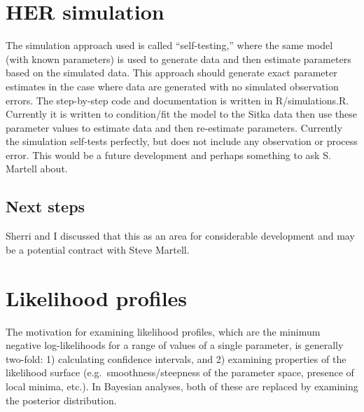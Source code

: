 \documentclass[]{article}
\begin{document}
\section{HER simulation}\label{her-simulation}

The simulation approach used is called ``self-testing,'' where the same
model (with known parameters) is used to generate data and then estimate
parameters based on the simulated data. This approach should generate
exact parameter estimates in the case where data are generated with no
simulated observation errors. The step-by-step code and documentation is
written in R/simulations.R. Currently it is written to condition/fit the
model to the Sitka data then use these parameter values to estimate data
and then re-estimate parameters. Currently the simulation self-tests
perfectly, but does not include any observation or process error. This
would be a future development and perhaps something to ask S. Martell
about.

\subsection{Next steps}\label{next-steps-4}

Sherri and I discussed that this as an area for considerable development
and may be a potential contract with Steve Martell.

\section{Likelihood profiles}\label{likelihood-profiles}

The motivation for examining likelihood profiles, which are the minimum
negative log-likelihoods for a range of values of a single parameter, is
generally two-fold: 1) calculating confidence intervals, and 2)
examining properties of the likelihood surface
(e.g.~smoothness/steepness of the parameter space, presence of local
minima, etc.). In Bayesian analyses, both of these are replaced by
examining the posterior distribution.
\end{document}
